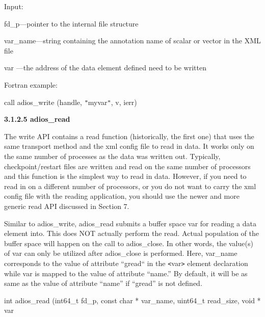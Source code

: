 \vspace{10pt}
Input:

\vspace{10pt}
\leftskip=45pt
fd\_p---pointer to the internal file structure

\vspace{10pt}
\leftskip=117pt
\parindent=-72pt
var\_name---string containing the annotation name of scalar or vector in the XML 
file

\vspace{10pt}
\leftskip=45pt
\parindent=0pt
var ---the address of the data element defined need to be written

\vspace{10pt}
\leftskip=22pt
Fortran example: 

\vspace{10pt}
call adios\_write (handle, \texttt{"}myvar\texttt{"}, v, ierr)\label{HRef119484357}

\vspace{22pt}
\leftskip=0pt
\textbf{3.1.2.5 adios\_read}

\vspace{10pt}
The write API contains a read function (historically, the first one) that uses 
the same transport method and the xml config file to read in data. It works only 
on the same number of processes as the data was written out. Typically, checkpoint/restart 
files are written and read on the same number of processors and this function is 
the simplest way to read in data. However, if you need to read in on a different 
number of processors, or you do not want to carry the xml config file with the 
reading application, you should use the newer and more generic read API discussed 
in Section 7.

\vspace{10pt}
Similar to adios\_write, {\color{color01} adios\_read submits a buffer space var 
for reading a data element into. This does NOT actually perform the read. Actual 
population of the buffer space will happen on the call to adios\_close. In other 
words, the value(s) of var can only be utilized after adios\_close is performed. 
Here, }var\_name corresponds to the value of attribute ``gread`` in the \texttt{<}var\texttt{>} 
element declaration while var is mapped to the value of attribute ``name.'' By 
default, it will be as same as the value of attribute ``name'' if ``gread'' is 
not defined.

\vspace{10pt}
\leftskip=103pt
\parindent=-81pt
int adios\_read (int64\_t fd\_p, const char * var\_name, uint64\_t  read\_size, 
void * var

